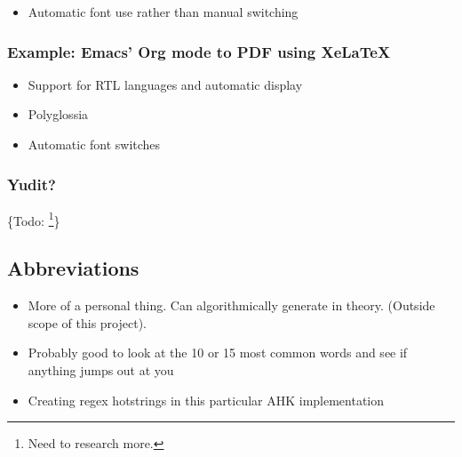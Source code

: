 \documentclass[11pt]{article}
\begin{document}
\begin{itemize}
\item Automatic font use rather than manual switching
\end{itemize}

\subsubsection{Example: Emacs' Org mode to PDF using XeLaTeX}
\label{sec:orgfe5868c}

\begin{itemize}
\item Support for RTL languages and automatic display
\item Polyglossia
\item Automatic font switches
\end{itemize}

\subsubsection{Yudit?}
\label{sec:org922c9c5}

\{Todo: \footnote{Need to research more.}\}

\subsection{Abbreviations}
\label{sec:org64b37c5}

\begin{itemize}
\item More of a personal thing. Can algorithmically generate in theory. (Outside scope of this project).
\item Probably good to look at the 10 or 15 most common words and see if anything jumps out at you
\item Creating regex hotstrings in this particular AHK implementation
\end{itemize}
\end{document}
